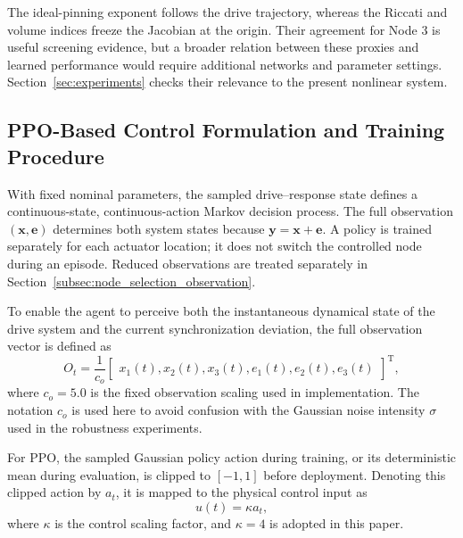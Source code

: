 \documentclass[a4paper,fleqn]{cas-sc}
\theoremstyle{plain}
\theoremstyle{definition}
\begin{document}
The ideal-pinning exponent follows the drive trajectory, whereas the Riccati and volume indices freeze the Jacobian at the origin. Their agreement for Node 3 is useful screening evidence, but a broader relation between these proxies and learned performance would require additional networks and parameter settings. Section~\ref{sec:experiments} checks their relevance to the present nonlinear system.

\subsection{PPO-Based Control Formulation and Training Procedure}
\label{subsec:ppo_control_framework}

With fixed nominal parameters, the sampled drive--response state defines a continuous-state, continuous-action Markov decision process. The full observation $(\mathbf x,\mathbf e)$ determines both system states because $\mathbf y=\mathbf x+\mathbf e$. A policy is trained separately for each actuator location; it does not switch the controlled node during an episode. Reduced observations are treated separately in Section~\ref{subsec:node_selection_observation}.


To enable the agent to perceive both the instantaneous dynamical state of the drive system and the current synchronization deviation, the full observation vector is defined as
\begin{equation}
	O_t
	=
	\frac{1}{c_o}
	\begin{bmatrix}
		x_1(t),x_2(t),x_3(t),
		e_1(t),e_2(t),e_3(t)
	\end{bmatrix}^{\mathrm T},
	\label{eq:observation_space}
\end{equation}
where $c_o=5.0$ is the fixed observation scaling used in implementation. The notation $c_o$ is used here to avoid confusion with the Gaussian noise intensity $\sigma$ used in the robustness experiments.

For PPO, the sampled Gaussian policy action during training, or its deterministic mean during evaluation, is clipped to $[-1,1]$ before deployment. Denoting this clipped action by $a_t$, it is mapped to the physical control input as
\begin{equation}
	u(t)=\kappa a_t,
	\label{eq:action_mapping}
\end{equation}
where $\kappa$ is the control scaling factor, and $\kappa=4$ is adopted in this paper.
\end{document}
